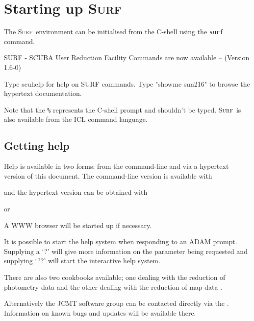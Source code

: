 \documentclass[twoside,11pt]{starlink}
\providecommand{\scusoft}          {\textsc{Surf}}
\begin{document}
\section{Starting up \scusoft \label{startup}}

The \scusoft\ environment can be initialised from the C-shell using the
\texttt{surf} command.

\begin{terminalv}

   SURF - SCUBA User Reduction Facility
     Commands are now available -- (Version 1.6-0)

     Type scuhelp for help on SURF commands.
     Type "showme sun216" to browse the hypertext documentation.

\end{terminalv}

Note that the \texttt{\%} represents the C-shell prompt and shouldn't be typed.
\scusoft\ is also available from the ICL command language.


\subsection{Getting help}

Help is available in two forms; from the command-line and via a hypertext
version of this document. The command-line version is available with

\begin{terminalv}
\end{terminalv}

and the hypertext version can be obtained with

\begin{terminalv}
\end{terminalv}
or
\begin{terminalv}
\end{terminalv}
A WWW browser will be started up if necessary.

It is possible to start the help system when responding to
an ADAM prompt. Supplying a `?' will give more information on the
parameter being requested and supplying `??' will start the interactive
help system.

There are also two cookbooks available; one dealing with the reduction of
photometry data \cite{S97} and the other dealing with the reduction of
map data \cite{SANDELL97}.

Alternatively the JCMT software group can be contacted directly via the
.
Information on known bugs and updates will be available there.
\end{document}

